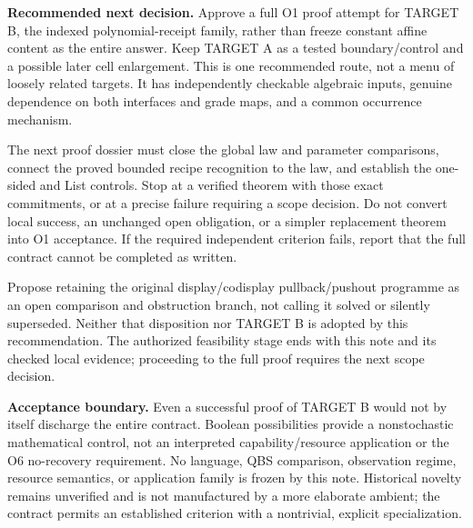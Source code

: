 \documentclass[11pt,a4paper]{article}
\newcommand{\status}[1]{\textbf{#1.}}
\begin{document}
\status{Recommended next decision}
Approve a full O1 proof attempt for TARGET B, the indexed polynomial-receipt
family, rather than freeze constant affine content as the entire answer.
Keep TARGET A as a tested boundary/control and a possible later cell
enlargement. This is one recommended route, not a menu of loosely related
targets. It has independently checkable algebraic inputs, genuine dependence
on both interfaces and grade maps, and a common occurrence mechanism.

The next proof dossier must close the global law and parameter comparisons,
connect the proved bounded recipe recognition to the law, and establish the one-sided
and List controls. Stop at a verified theorem with those exact commitments,
or at a precise failure requiring a scope decision. Do not convert local
success, an unchanged open obligation, or a simpler replacement theorem into
O1 acceptance. If the required independent criterion fails, report that the
full contract cannot be completed as written.

Propose retaining the original display/codisplay pullback/pushout programme
as an open comparison and obstruction branch, not calling it solved or
silently superseded. Neither that disposition nor TARGET B is adopted by
this recommendation. The authorized feasibility stage ends with this note
and its checked local evidence; proceeding to the full proof requires the
next scope decision.

\status{Acceptance boundary}
Even a successful proof of TARGET B would not by itself discharge the
entire contract. Boolean possibilities provide a nonstochastic mathematical
control, not an interpreted capability/resource application or the O6
no-recovery requirement. No language, QBS comparison, observation regime,
resource semantics, or application family is frozen by this note. Historical
novelty remains unverified and is not manufactured by a more elaborate
ambient; the contract permits an established criterion with a nontrivial,
explicit specialization.
\end{document}

